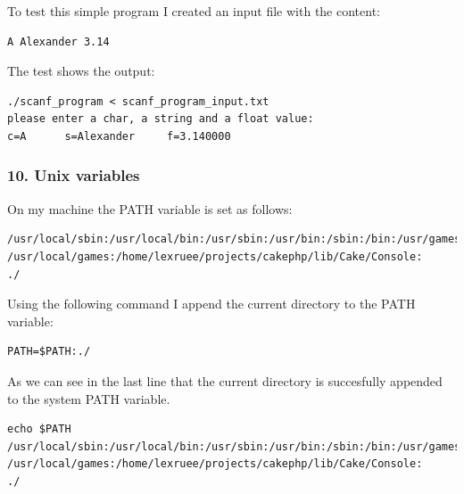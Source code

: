\documentclass[12pt]{article}
\begin{document}
To test this simple program I created an input file with the content:
\begin{lstlisting}
A Alexander 3.14
\end{lstlisting}
The test shows the output:
\begin{lstlisting}
./scanf_program < scanf_program_input.txt 
please enter a char, a string and a float value:
c=A 	 s=Alexander 	 f=3.140000
\end{lstlisting}
\subsubsection*{10. Unix variables}
On my machine the PATH variable is set as follows:
\begin{lstlisting}
/usr/local/sbin:/usr/local/bin:/usr/sbin:/usr/bin:/sbin:/bin:/usr/games:
/usr/local/games:/home/lexruee/projects/cakephp/lib/Cake/Console:
./
\end{lstlisting}
Using the following command I append the current directory to the PATH  variable:
\begin{lstlisting}
PATH=$PATH:./
\end{lstlisting}

As we can see in the last line that the current directory is succesfully appended to the system PATH variable.
\begin{lstlisting}
echo $PATH
/usr/local/sbin:/usr/local/bin:/usr/sbin:/usr/bin:/sbin:/bin:/usr/games:
/usr/local/games:/home/lexruee/projects/cakephp/lib/Cake/Console:
./
\end{lstlisting}
\end{document}
